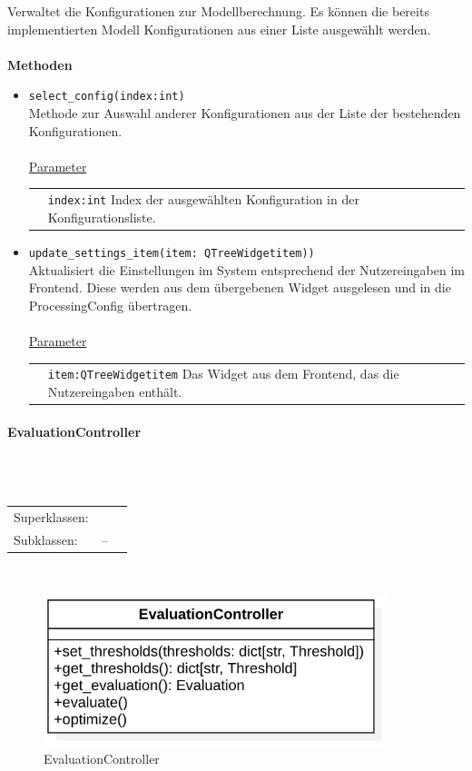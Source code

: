 \documentclass{article}
\newcommand{\classheader}[2][]{\paragraph{#2}
\mbox{}\textit{#1}\\\\}
\newcommand{\classref}[1]{\texttt{\nameref{cls:#1}}}
\begin{document}
Verwaltet die Konfigurationen zur Modellberechnung. Es können die bereits implementierten Modell Konfigurationen aus einer Liste ausgewählt werden. \\\\
\textbf{\large{Methoden}}
\begin{itemize}
\item \texttt{select\_config(index:int)}\\ Methode zur Auswahl anderer Konfigurationen aus der Liste der bestehenden Konfigurationen.\\\\
\underline{{Parameter}}\\
\begin{tabular}{lp{10.7cm}}
 & \texttt{index:int} Index der ausgewählten Konfiguration in der Konfigurationsliste. \\
\end{tabular}
\item \texttt{update\_settings\_item(item: QTreeWidgetitem))}\\ Aktualisiert die Einstellungen im System entsprechend der Nutzereingaben im Frontend. Diese werden aus dem übergebenen Widget ausgelesen und in die ProcessingConfig übertragen.\\\\
\underline{{Parameter}}\\
\begin{tabular}{lp{10.7cm}}
 & \texttt{item:QTreeWidgetitem} Das Widget aus dem Frontend, das die Nutzereingaben enthält. \\
\end{tabular}
\end{itemize}


\newpage
\classheader{EvaluationController}\label{cls:EvaluationController}
\begin{tabular}{lll}
 Superklassen: & \classref{AbstractController}\\
 Subklassen: & --
\end{tabular}\\
\begin{figure}[H]%
    \centering
    \includegraphics[width=10cm]{docs/entwurf/Floriane/EvaluationController.png}
    \caption{EvaluationController}
\end{figure}
\end{document}
